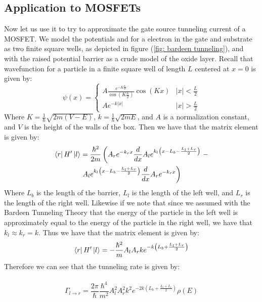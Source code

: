 \documentclass[
  reprint,
  amsmath,amssymb,
  aps
]{revtex4-1}
\begin{document}
\subsection{\label{sec:level2}Application to MOSFETs}
Now let us use it to try to approximate the gate source tunneling current 
of a MOSFET. We model the potentials and for a electron in the 
gate and substrate as two finite square wells, as depicted in figure (\ref{fig: bardeen tunneling}), and with the 
raised potential barrier as a crude model of the oxide layer. Recall that 
wavefunction for a particle in a finite square well of length  $L$ centered at $x=0$ is given by:
\begin{equation}
    \psi(x) = \begin{cases}
        A\frac{e^{-K\frac{L}{2}}}{\cos(K\frac{L}{2})}\cos(Kx) & |x|<\frac{L}{2}\\
        Ae^{-k|x|} & |x|>\frac{L}{2}
    \end{cases}
\end{equation}
Where $K = \frac{1}{\hbar}\sqrt{2m(V-E)}$, $k=\frac{1}{\hbar}\sqrt{2mE}$, and $A$ is a normalization constant, and $V$ is the height of the 
walls of the box. Then we have that 
the matrix element is given by:
\begin{multline}
    \bra{r}H'\ket{l} = \frac{\hbar^2}{2m}\left(
        A_re^{-k_r x} \frac{d}{dx}A_le^{k_l \left(x-L_{b}-\frac{L_l+L_r}{2}\right)}\right. -\\
         \left.A_le^{k_l \left(x-L_{b}-\frac{L_l+L_r}{2}\right)}\frac{d}{dx}A_re^{-k_r x}\right)
\end{multline}
Where $L_b$ is the length of the barrier, $L_l$ is the length of the left well, and $L_r$ is the length of the right well. 
Likewise if we note that since we assumed with the Bardeen Tunneling Theory that the energy of the particle in the 
left well is approximately equal to the energy of the particle in the right well, we have that $k_l \approx k_r = k$. Thus we 
have that the matrix element is given by:
\begin{equation}
    \bra{r}H'\ket{l} = -\frac{\hbar^2}{m}A_l A_r k e^{-k\left(L_b+\frac{L_l+L_r}{2}\right)}
\end{equation}
Therefore we can see that the tunneling rate is given by:\\\\
\begin{equation}
    \Gamma_{l\rightarrow r} = \frac{2\pi}{\hbar}\frac{\hbar^4}{m^2}A_l^2 A_r^2 k^2 e^{-2k\left(L_b+\frac{L_l+L_r}{2}\right)}\rho(E)
\end{equation}
\end{document}
